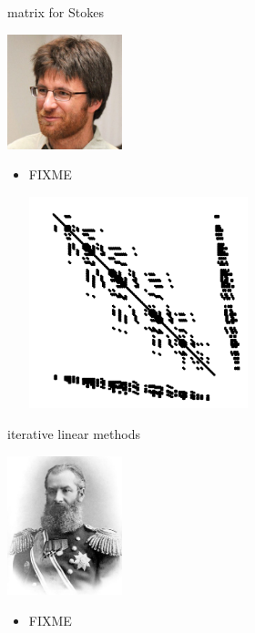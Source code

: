 \documentclass[10pt,hyperref,dvipsnames]{beamer}
\begin{document}
\begin{frame}{matrix for Stokes}

\hfill \includegraphics[width=0.25\textwidth]{figs/people/jbrown}

\vspace{-20mm}
\begin{itemize}
\item FIXME
\begin{center}
\includegraphics[width=0.5\textwidth]{figs/Kstokes.pdf}
\end{center}
\end{itemize}
\end{frame}


\begin{frame}{iterative linear methods}

\hfill \includegraphics[width=0.25\textwidth]{figs/people/akrylov.jpg}

\vspace{-20mm}
\begin{itemize}
\item FIXME
\end{itemize}
\end{frame}
\end{document}

